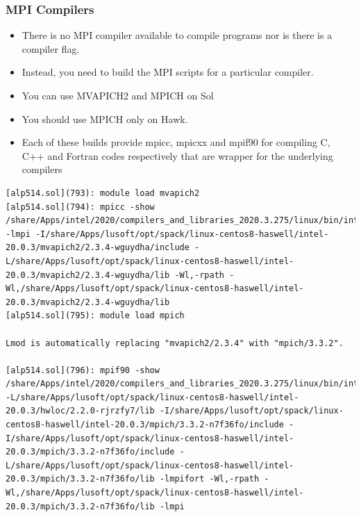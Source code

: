 \documentclass[10pt,t]{beamer}
\begin{document}
\begin{frame}[fragile]
  \frametitle{MPI Compilers}
  \begin{itemize}
    \item There is no MPI compiler available to compile programs nor is there is a compiler flag.
    \item Instead, you need to build the MPI scripts for a particular compiler.
    \item You can use MVAPICH2 and MPICH on Sol
    \item You should use MPICH only on Hawk. 
    \item Each of these builds provide mpicc, mpicxx and mpif90 for compiling C, C++ and Fortran codes respectively that are wrapper for the underlying compilers
  \end{itemize}
  \begin{lstlisting}[basicstyle=\tiny\ttfamily]
[alp514.sol](793): module load mvapich2
[alp514.sol](794): mpicc -show
/share/Apps/intel/2020/compilers_and_libraries_2020.3.275/linux/bin/intel64/icc -lmpi -I/share/Apps/lusoft/opt/spack/linux-centos8-haswell/intel-20.0.3/mvapich2/2.3.4-wguydha/include -L/share/Apps/lusoft/opt/spack/linux-centos8-haswell/intel-20.0.3/mvapich2/2.3.4-wguydha/lib -Wl,-rpath -Wl,/share/Apps/lusoft/opt/spack/linux-centos8-haswell/intel-20.0.3/mvapich2/2.3.4-wguydha/lib
[alp514.sol](795): module load mpich

Lmod is automatically replacing "mvapich2/2.3.4" with "mpich/3.3.2".

[alp514.sol](796): mpif90 -show
/share/Apps/intel/2020/compilers_and_libraries_2020.3.275/linux/bin/intel64/ifort -L/share/Apps/lusoft/opt/spack/linux-centos8-haswell/intel-20.0.3/hwloc/2.2.0-rjrzfy7/lib -I/share/Apps/lusoft/opt/spack/linux-centos8-haswell/intel-20.0.3/mpich/3.3.2-n7f36fo/include -I/share/Apps/lusoft/opt/spack/linux-centos8-haswell/intel-20.0.3/mpich/3.3.2-n7f36fo/include -L/share/Apps/lusoft/opt/spack/linux-centos8-haswell/intel-20.0.3/mpich/3.3.2-n7f36fo/lib -lmpifort -Wl,-rpath -Wl,/share/Apps/lusoft/opt/spack/linux-centos8-haswell/intel-20.0.3/mpich/3.3.2-n7f36fo/lib -lmpi
  \end{lstlisting}
\end{frame}
\end{document}
